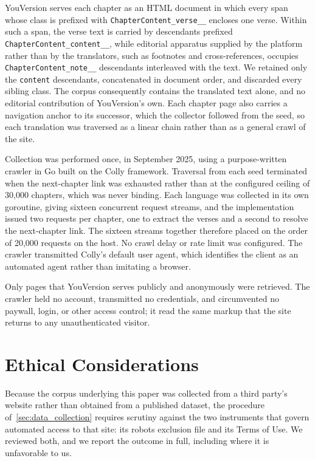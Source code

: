 YouVersion serves each chapter as an HTML document in which every span whose
class is prefixed with \texttt{ChapterContent\_verse\_\_} encloses one verse.
Within such a span, the verse text is carried by descendants prefixed
\texttt{ChapterContent\_content\_\_}, while editorial apparatus supplied by the
platform rather than by the translators, such as footnotes and
cross-references, occupies \texttt{ChapterContent\_note\_\_} descendants
interleaved with the text. We retained only the \texttt{content} descendants,
concatenated in document order, and discarded every sibling class. The corpus
consequently contains the translated text alone, and no editorial contribution
of YouVersion's own. Each chapter page also carries a navigation anchor to its
successor, which the collector followed from the seed, so each translation was
traversed as a linear chain rather than as a general crawl of the site.

Collection was performed once, in September 2025, using a purpose-written
crawler in Go built on the Colly framework. Traversal from each seed terminated
when the next-chapter link was exhausted rather than at the configured ceiling
of 30,000 chapters, which was never binding. Each language was collected in its
own goroutine, giving sixteen
concurrent request streams, and the implementation issued two requests per
chapter, one to extract the verses and a second to resolve the next-chapter
link. The sixteen streams together therefore placed on the order of 20,000
requests on the host. No crawl delay or rate limit was configured. The crawler
transmitted Colly's default user agent, which identifies the client as an
automated agent rather than imitating a browser.

Only pages that YouVersion serves publicly and anonymously were retrieved. The
crawler held no account, transmitted no credentials, and circumvented no
paywall, login, or other access control; it read the same markup that the site
returns to any unauthenticated visitor.

\section{Ethical Considerations}\label{sec:ethics}

Because the corpus underlying this paper was collected from a third party's
website rather than obtained from a published dataset, the procedure
of~\cref{sec:data_collection} requires scrutiny against the two instruments that
govern automated access to that site: its robots exclusion file and its Terms of
Use. We reviewed both, and we report the outcome in full, including where it is
unfavorable to us.

